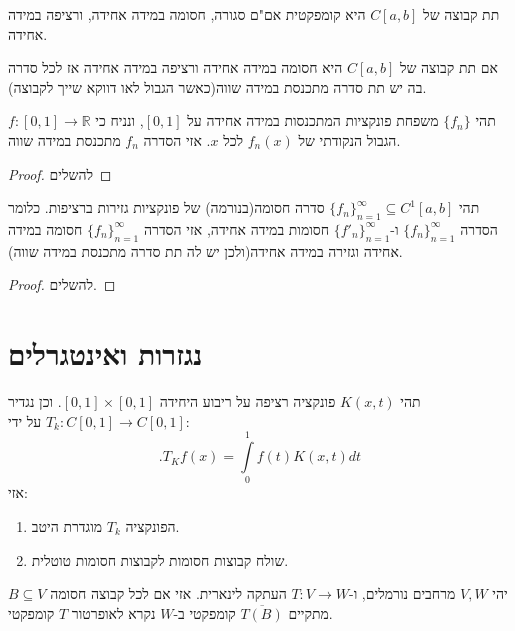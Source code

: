 \documentclass{tstextbook}
\begin{document}
\begin{corollary}
תת קבוצה של \(C[a,b]\) היא קומפקטית אם"ם סגורה, חסומה במידה אחידה, ורציפה במידה אחידה.

\end{corollary}
\begin{corollary}
אם תת קבוצה של \(C[a,b]\) היא חסומה במידה אחידה ורציפה במידה אחידה אז לכל סדרה בה יש תת סדרה מתכנסת במידה שווה(כאשר הגבול לאו דווקא שייך לקבוצה).

\end{corollary}
\begin{proposition}
תהי \(\{ f_{n} \}\) משפחת פונקציות המתכנסות במידה אחידה על \([0,1]\), ונניח כי \(f:[0,1]\to \mathbb{R}\) הגבול הנקודתי של \(f_{n}(x)\) לכל \(x\). אזי הסדרה \(f_{n}\) מתכנסת במידה שווה.

\end{proposition}
\begin{proof}
להשלים

\end{proof}
\begin{theorem}
תהי \(\{ f_{n} \}_{n=1}^{\infty}\subseteq C^{1}[a,b]\) סדרה חסומה(בנורמה) של פונקציות גזירות ברציפות. כלומר הסדרה \(\{ f_{n} \}_{n=1}^{\infty}\) ו-\(\{ f'_{n} \}_{n=1}^{\infty}\) חסומות במידה אחידה, אזי הסדרה \(\{ f_{n} \}_{n=1}^{\infty}\) חסומה במידה אחידה וגזירה במידה אחידה(ולכן יש לה תת סדרה מתכנסת במידה שווה).

\end{theorem}
\begin{proof}
להשלים.

\end{proof}
\section{נגזרות ואינטגרלים}

\begin{proposition}
תהי \(K(x,t)\) פונקציה רציפה על ריבוע היחידה \([0,1]\times[0,1]\). וכן נגדיר \(T_{k}:C[0,1]\to C[0,1]\) על ידי:
$$.T_{K}f(x)=\!\!\int\limits_{0}^{1}f(t)K(x,t)d t$$
אזי:

  \begin{enumerate}
    \item הפונקציה \(T_{k}\) מוגדרת היטב. 


    \item שולח קבוצות חסומות לקבוצות חסומות טוטלית. 


  \end{enumerate}
\end{proposition}
\begin{definition}
יהי \(V,W\) מרחבים נורמלים, ו-\(T:V\to W\) העתקה לינארית. אזי אם לכל קבוצה חסומה \(B\subseteq V\) מתקיים \(\overline{T(B)}\) קומפקטי ב-\(W\) נקרא לאופרטור \(T\) קומפקטי.

\end{definition}
\end{document}

